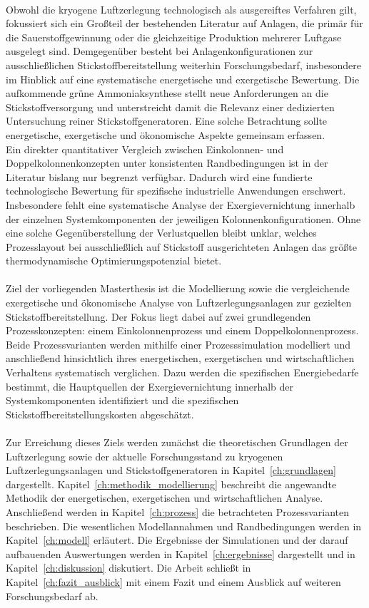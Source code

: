 \\ %
Obwohl die kryogene Luftzerlegung technologisch als ausgereiftes Verfahren gilt, fokussiert sich ein Großteil der bestehenden Literatur auf Anlagen, die primär für die Sauerstoffgewinnung oder die gleichzeitige Produktion mehrerer Luftgase ausgelegt sind. Demgegenüber besteht bei Anlagenkonfigurationen zur ausschließlichen Stickstoffbereitstellung weiterhin Forschungsbedarf, insbesondere im Hinblick auf eine systematische energetische und exergetische Bewertung. Die aufkommende grüne Ammoniaksynthese stellt neue Anforderungen an die Stickstoffversorgung und unterstreicht damit die Relevanz einer dedizierten Untersuchung reiner Stickstoffgeneratoren. Eine solche Betrachtung sollte energetische, exergetische und ökonomische Aspekte gemeinsam erfassen. \\
Ein direkter quantitativer Vergleich zwischen Einkolonnen- und Doppelkolonnenkonzepten unter konsistenten Randbedingungen ist in der Literatur bislang nur begrenzt verfügbar. Dadurch wird eine fundierte technologische Bewertung für spezifische industrielle Anwendungen erschwert. Insbesondere fehlt eine systematische Analyse der Exergievernichtung innerhalb der einzelnen Systemkomponenten der jeweiligen Kolonnenkonfigurationen. Ohne eine solche Gegenüberstellung der Verlustquellen bleibt unklar, welches Prozesslayout bei ausschließlich auf Stickstoff ausgerichteten Anlagen das größte thermodynamische Optimierungspotenzial bietet. \\
\\%
Ziel der vorliegenden Masterthesis ist die Modellierung sowie die vergleichende exergetische und ökonomische Analyse von Luftzerlegungsanlagen zur gezielten Stickstoffbereitstellung. Der Fokus liegt dabei auf zwei grundlegenden Prozesskonzepten: einem Einkolonnenprozess und einem Doppelkolonnenprozess. Beide Prozessvarianten werden mithilfe einer Prozesssimulation modelliert und anschließend hinsichtlich ihres energetischen, exergetischen und wirtschaftlichen Verhaltens systematisch verglichen. Dazu werden die spezifischen Energiebedarfe bestimmt, die Hauptquellen der Exergievernichtung innerhalb der Systemkomponenten identifiziert und die spezifischen Stickstoffbereitstellungskosten abgeschätzt.\\
\\%
Zur Erreichung dieses Ziels werden zunächst die theoretischen Grundlagen der Luftzerlegung sowie der aktuelle Forschungsstand zu kryogenen Luftzerlegungsanlagen und Stickstoffgeneratoren in Kapitel~\ref{ch:grundlagen} dargestellt. Kapitel~\ref{ch:methodik_modellierung} beschreibt die angewandte Methodik der energetischen, exergetischen und wirtschaftlichen Analyse. Anschließend werden in Kapitel~\ref{ch:prozess} die betrachteten Prozessvarianten beschrieben. Die wesentlichen Modellannahmen und Randbedingungen werden in Kapitel~\ref{ch:modell} erläutert. Die Ergebnisse der Simulationen und der darauf aufbauenden Auswertungen werden in Kapitel~\ref{ch:ergebnisse} dargestellt und in Kapitel~\ref{ch:diskussion} diskutiert. Die Arbeit schließt in Kapitel~\ref{ch:fazit_ausblick} mit einem Fazit und einem Ausblick auf weiteren Forschungsbedarf ab.\\


